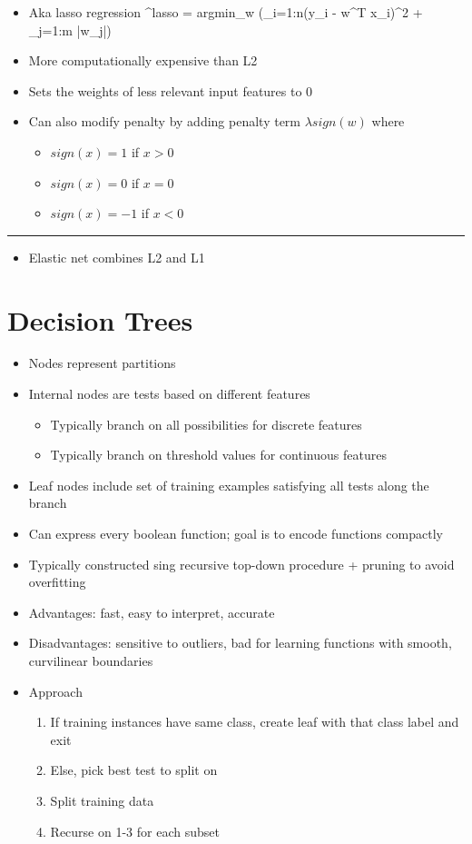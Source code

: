 \documentclass[12pt]{article}
\newcommand{\abs}[1]{\left|#1\right|}
\newcommand{\divider}[0]{\par\textcolor{lightgray}{\rule{\textwidth}{0.1pt}}}
\newenvironment{eqn}{\equation\alignedat{3}}{\endalignedat\endequation}
\begin{document}
\begin{itemize}
	\item Aka lasso regression
	\begin{eqn}
		^{lasso} = argmin_w (\Sigma_{i=1:n}(y_i - w^T x_i)^2 + \lambda \Sigma_{j=1:m} \abs{w_j})
	\end{eqn}
	\item More computationally expensive than L2
	\item Sets the weights of less relevant input features to 0
	\item Can also modify penalty by adding penalty term $\lambda sign(w)$ where 
	\begin{itemize}
		\item $sign(x) = 1$ if $x > 0$
		\item $sign(x) = 0$ if $x = 0$
		\item $sign(x) = -1$ if $x < 0$
	\end{itemize}
\end{itemize}

\divider

\begin{itemize}
	\item Elastic net combines L2 and L1
\end{itemize}

\section{Decision Trees}

\begin{itemize}
	\item Nodes represent partitions
	\item Internal nodes are tests based on different features
	\begin{itemize}
		\item Typically branch on all possibilities for discrete features
		\item Typically branch on threshold values for continuous features
	\end{itemize}
	\item Leaf nodes include set of training examples satisfying all tests along the branch
	\item Can express every boolean function; goal is to encode functions compactly
	\item Typically constructed sing recursive top-down procedure + pruning to avoid overfitting
	\item Advantages: fast, easy to interpret, accurate 
	\item Disadvantages: sensitive to outliers, bad for learning functions with smooth, curvilinear boundaries
	\item Approach
	\begin{enumerate}
		\item If training instances have same class, create leaf with that class label and exit 
		\item Else, pick best test to split on 
		\item Split training data 
		\item Recurse on 1-3 for each subset
	\end{enumerate}
\end{itemize}
\end{document}

